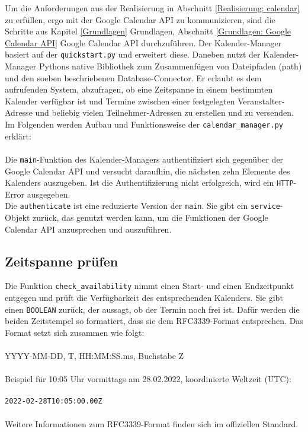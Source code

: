         \label{Implementierung: calendar_manager.py}
        Um die Anforderungen aus der Realisierung in Abschnitt \ref*{Realisierung: calendar} zu erfüllen, ergo mit der Google Calendar API zu kommunizieren, sind die Schritte aus Kapitel \ref*{Grundlagen} Grundlagen, Abschnitt \ref*{Grundlagen: Google Calendar API} Google Calendar API durchzuführen. Der Kalender-Manager basiert auf der \verb|quickstart.py| und erweitert diese. Daneben nutzt der Kalender-Manager Pythons native Bibliothek zum Zusammenfügen von Dateipfaden (path) und den soeben beschriebenen Database-Connector. Er erlaubt es dem aufrufenden System, abzufragen, ob eine Zeitspanne in einem bestimmten Kalender verfügbar ist und Termine zwischen einer festgelegten Veranstalter-Adresse und beliebig vielen Teilnehmer-Adressen zu erstellen und zu versenden. Im Folgenden werden Aufbau und Funktionsweise der \verb|calendar_manager.py| erklärt: \\ 
        \\
        Die \verb|main|-Funktion des Kalender-Managers authentifiziert sich gegenüber der Google Calendar API und versucht daraufhin, die nächsten zehn Elemente des Kalenders auszugeben. Ist die Authentifizierung nicht erfolgreich, wird ein \verb|HTTP|-Error ausgegeben.  \\
        Die \verb|authenticate| ist eine reduzierte Version der \verb|main|. Sie gibt ein \verb|service|-Objekt zurück, das genutzt werden kann, um die Funktionen der Google Calendar API anzusprechen und auszuführen.\\
        
        \subsection{Zeitspanne prüfen}
            Die Funktion \verb|check_availability| nimmt einen Start- und einen Endzeitpunkt entgegen und prüft die Verfügbarkeit des entsprechenden Kalenders. Sie gibt einen \verb|BOOLEAN| zurück, der aussagt, ob der Termin noch frei ist. Dafür werden die beiden Zeitstempel so formatiert, dass sie dem RFC3339-Format entsprechen. Das Format setzt sich zusammen wie folgt: \\
            \\
            YYYY-MM-DD, \glq T\grq, HH:MM:SS.ms, Buchstabe \glq Z\grq \\
            \\
            Beispiel für 10:05 Uhr vormittags am 28.02.2022, koordinierte Weltzeit (UTC): \\
            \\
            \verb/2022-02-28T10:05:00.00Z/ \\
            \\
            Weitere Informationen zum RFC3339-Format finden sich im offiziellen Standard. \cite{date_time} \\
            
